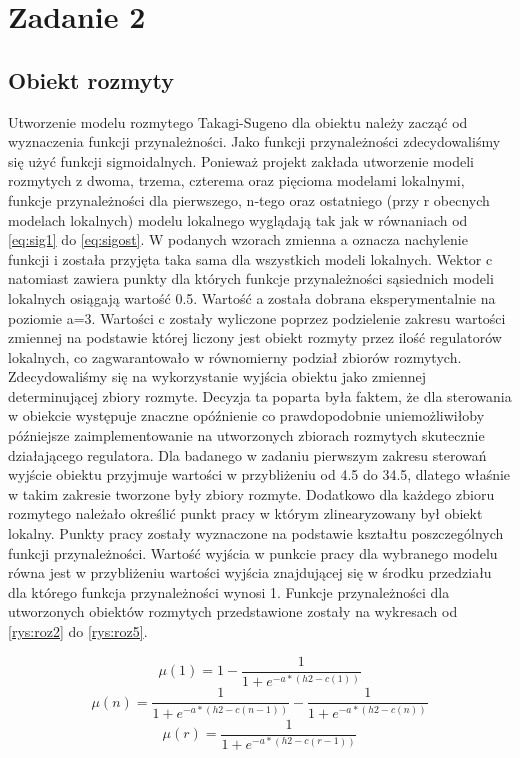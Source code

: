 \chapter{Zadanie 2}
	\label{ch:zadanie2}
	
	\section{Obiekt rozmyty}
		\label{sec:ob_roz}
		Utworzenie modelu rozmytego Takagi-Sugeno dla obiektu należy zacząć od wyznaczenia funkcji przynależności. Jako funkcji przynależności zdecydowaliśmy się użyć funkcji sigmoidalnych. Ponieważ projekt zakłada utworzenie modeli rozmytych z dwoma, trzema, czterema oraz pięcioma modelami lokalnymi, funkcje przynależności dla pierwszego, n-tego oraz ostatniego (przy r obecnych modelach lokalnych) modelu lokalnego wyglądają tak jak w równaniach od \ref{eq:sig1} do \ref{eq:sigost}. W podanych wzorach zmienna a oznacza nachylenie funkcji i została przyjęta taka sama dla wszystkich modeli lokalnych. Wektor c natomiast zawiera punkty dla których funkcje przynależności sąsiednich modeli lokalnych osiągają wartość 0.5. Wartość a została dobrana eksperymentalnie na poziomie a=3. Wartości c zostały wyliczone poprzez podzielenie zakresu wartości zmiennej na podstawie której liczony jest obiekt rozmyty przez ilość regulatorów lokalnych, co zagwarantowało w równomierny podział zbiorów rozmytych. Zdecydowaliśmy się na wykorzystanie wyjścia obiektu jako zmiennej determinującej zbiory rozmyte. Decyzja ta poparta była faktem, że dla sterowania w obiekcie występuje znaczne opóźnienie co prawdopodobnie uniemożliwiłoby późniejsze zaimplementowanie na utworzonych zbiorach rozmytych skutecznie działającego regulatora. Dla badanego w zadaniu pierwszym zakresu sterowań wyjście obiektu przyjmuje wartości w przybliżeniu od 4.5 do 34.5, dlatego właśnie w takim zakresie tworzone były zbiory rozmyte. Dodatkowo dla każdego zbioru rozmytego należało określić punkt pracy w którym zlinearyzowany był obiekt lokalny. Punkty pracy zostały wyznaczone na podstawie kształtu poszczególnych funkcji przynależności. Wartość wyjścia w punkcie pracy dla wybranego modelu równa jest w przybliżeniu wartości wyjścia znajdującej się w środku przedziału dla którego funkcja przynależności wynosi 1. Funkcje przynależności dla utworzonych obiektów rozmytych przedstawione zostały na wykresach od \ref{rys:roz2} do \ref{rys:roz5}.
		
		\begin{equation}
			\mu(1) = 1-\frac{1}{1+e^{-a*(h2-c(1))}}
			\label{eq:sig1}
		\end{equation}
		\begin{equation}
			\mu(n) = \frac{1}{1+e^{-a*(h2-c(n-1))}}-\frac{1}{1+e^{-a*(h2-c(n))}}
			\label{eq:sign}
		\end{equation}
		\begin{equation}
		\mu(r) = \frac{1}{1+e^{-a*(h2-c(r-1))}}
		\label{eq:sigost}
		\end{equation}
		
